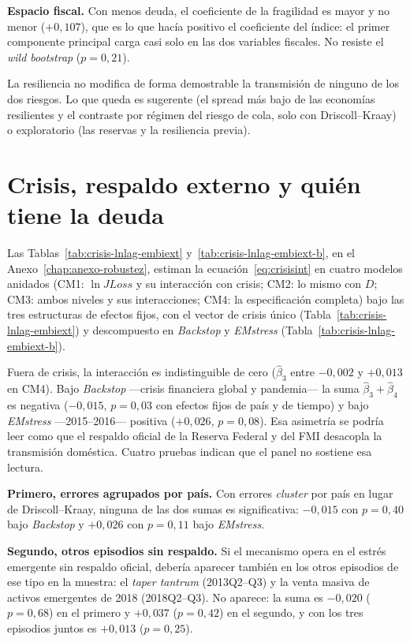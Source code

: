 \textbf{Espacio fiscal.} Con menos deuda, el coeficiente de la fragilidad es mayor y no menor ($+0{,}107$), que es lo que hacía positivo el coeficiente del índice: el primer componente principal carga casi solo en las dos variables fiscales. No resiste el \textit{wild bootstrap} ($p=0{,}21$).

La resiliencia no modifica de forma demostrable la transmisión de ninguno de los dos riesgos. Lo que queda es sugerente (el spread más bajo de las economías resilientes y el contraste por régimen del riesgo de cola, solo con Driscoll--Kraay) o exploratorio (las reservas y la resiliencia previa).

\section{Crisis, respaldo externo y quién tiene la deuda}
\label{sec:crisis-interaccion}

Las Tablas~\ref{tab:crisis-lnlag-embiext} y~\ref{tab:crisis-lnlag-embiext-b}, en el Anexo~\ref{chap:anexo-robustez}, estiman la ecuación~\eqref{eq:crisisint} en cuatro modelos anidados (CM1: $\ln JLoss$ y su interacción con crisis; CM2: lo mismo con $D$; CM3: ambos niveles y sus interacciones; CM4: la especificación completa) bajo las tres estructuras de efectos fijos, con el vector de crisis único (Tabla~\ref{tab:crisis-lnlag-embiext}) y descompuesto en \textit{Backstop} y \textit{EMstress} (Tabla~\ref{tab:crisis-lnlag-embiext-b}).

Fuera de crisis, la interacción es indistinguible de cero ($\hat\beta_3$ entre $-0{,}002$ y $+0{,}013$ en CM4). Bajo \textit{Backstop} ---crisis financiera global y pandemia--- la suma $\hat\beta_3+\hat\beta_4$ es negativa ($-0{,}015$, $p=0{,}03$ con efectos fijos de país y de tiempo) y bajo \textit{EMstress} ---2015--2016--- positiva ($+0{,}026$, $p=0{,}08$). Esa asimetría se podría leer como que el respaldo oficial de la Reserva Federal y del FMI desacopla la transmisión doméstica. Cuatro pruebas indican que el panel no sostiene esa lectura.

\textbf{Primero, errores agrupados por país.} Con errores \textit{cluster} por país en lugar de Driscoll--Kraay, ninguna de las dos sumas es significativa: $-0{,}015$ con $p=0{,}40$ bajo \textit{Backstop} y $+0{,}026$ con $p=0{,}11$ bajo \textit{EMstress}.

\textbf{Segundo, otros episodios sin respaldo.} Si el mecanismo opera en el estrés emergente sin respaldo oficial, debería aparecer también en los otros episodios de ese tipo en la muestra: el \textit{taper tantrum} (2013Q2--Q3) y la venta masiva de activos emergentes de 2018 (2018Q2--Q3). No aparece: la suma es $-0{,}020$ ($p=0{,}68$) en el primero y $+0{,}037$ ($p=0{,}42$) en el segundo, y con los tres episodios juntos es $+0{,}013$ ($p=0{,}25$).


